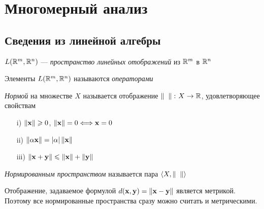 \chapter{Многомерный анализ}

\section{Сведения из линейной алгебры}

\begin{definition}
    $L(\mathbb{R}^m, \mathbb{R}^n)$ --- \textit{пространство линейных отображений} из $\mathbb{R}^m$ в $\mathbb{R}^n$
\end{definition}

\begin{definition}
    Элементы $L(\mathbb{R}^m, \mathbb{R}^n)$ называются \textit{операторами}
\end{definition}

\begin{definition}
    \textit{Нормой} на множестве $X$ называется отображение
     $\left\lVert\phantom{x}\right\rVert \colon X \to \mathbb{R}$, удовлетворяющее свойствам
     \begin{itemize}
         \item[i)] $\left\lVert\mathbf{x}\right\rVert \geqslant 0$, $\left\lVert\mathbf{x}\right\rVert = 0 \Longleftrightarrow \mathbf{x} = 0$
         \item[ii)] $\left\lVert\alpha\mathbf{x}\right\rVert = |\alpha|\left\lVert\mathbf{x}\right\rVert$
         \item[iii)] $\left\lVert\mathbf{x} + \mathbf{y}\right\rVert \leqslant \left\lVert\mathbf{x}\right\rVert + \left\lVert\mathbf{y}\right\rVert$
     \end{itemize}
\end{definition}

\begin{definition}
    \textit{Нормированным пространством} называется пара $\langle X,
    \left\lVert\phantom{x}\right\rVert \rangle$
\end{definition}

\begin{remark}
    Отображение, задаваемое формулой $d(\mathbf{x}, \mathbf{y}) = \left\lVert\mathbf{x} - \mathbf{y}\right\rVert$ является
    метрикой. Поэтому все нормированные пространства сразу можно считать
    и метрическими.
\end{remark}

